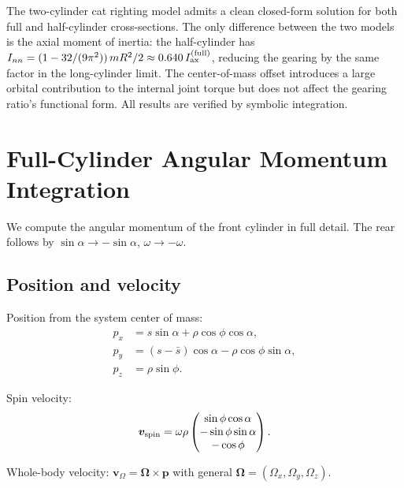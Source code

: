 \documentclass[11pt]{article}
\newcommand{\vect}[1]{\bm{#1}}
\begin{document}
The two-cylinder cat righting model admits a clean closed-form solution
for both full and half-cylinder cross-sections.  The only difference
between the two models is the axial moment of inertia: the half-cylinder
has $I_{nn}=(1-32/(9\pi^2))\,mR^2/2\approx0.640\,I_{\rm ax}^{(\rm full)}$,
reducing the gearing by the same factor in the long-cylinder limit.
The center-of-mass offset introduces a large orbital contribution to
the internal joint torque but does not affect the gearing ratio's
functional form.  All results are verified by symbolic integration.

\appendix

\section{Full-Cylinder Angular Momentum Integration}
\label{app:full}

We compute the angular momentum of the front cylinder in full detail.
The rear follows by $\sin\alpha\to-\sin\alpha$, $\omega\to-\omega$.

\subsection{Position and velocity}

Position from the system center of mass:
\begin{align}
p_x &= s\sin\alpha + \rho\cos\phi\cos\alpha, \label{eq:Apx}\\
p_y &= (s-\bar{s})\cos\alpha - \rho\cos\phi\sin\alpha, \label{eq:Apy}\\
p_z &= \rho\sin\phi. \label{eq:Apz}
\end{align}

Spin velocity:
\begin{equation}\label{eq:Avspin}
\vect{v}_{\rm spin} = \omega\rho
\begin{pmatrix}
\sin\phi\cos\alpha \\ -\sin\phi\sin\alpha \\ -\cos\phi
\end{pmatrix}.
\end{equation}

Whole-body velocity: $\vect{v}_\Omega = \vect{\Omega}\times\vect{p}$
with general $\vect{\Omega}=(\Omega_x,\Omega_y,\Omega_z)$.
\end{document}
